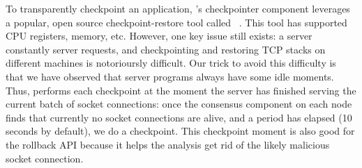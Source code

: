 To transparently checkpoint an application, \xxx's checkpointer component 
leverages a popular, open source checkpoint-restore tool called 
\criu~\cite{criu}. This tool has supported CPU registers, memory, etc. However, 
one key issue still exists: a server constantly server requests, and 
checkpointing and restoring TCP stacks on different machines is notorioursly 
difficult. Our trick to avoid this difficulty is that we have observed that 
server programs always have some idle moments. Thus, \xxx performs each 
checkpoint at the moment the server has finished serving the current batch of 
socket connections: once the \paxos consensus component on each node finds that 
currently no socket connections are alive, and a period has elapsed (10 seconds 
by default), we do a checkpoint. This checkpoint moment is also good for the 
rollback API because it helps the analysis get rid of the likely malicious socket 
connection.



